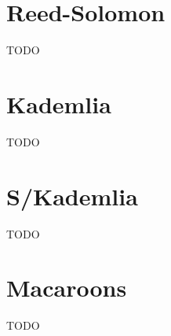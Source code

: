 \documentclass[a4paper,10pt]{article}
\newcommand{\todo}[1]{{\color{red} TODO #1}}
\begin{document}
\section{Reed-Solomon}

\todo{}

\section{Kademlia}

\todo{}

\section{S/Kademlia}

\todo{}

\section{Macaroons}

\todo{}

\newpage

\begingroup
  \raggedright
  
\endgroup
\end{document}
